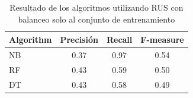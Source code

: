 \begin{table}[H]
\centering
\captionsetup{labelsep=period, labelfont=bf}
\caption{Resultado de los algoritmos utilizando RUS con balanceo solo al conjunto de entrenamiento}
\fontsize{12pt}{10pt}\selectfont
\begin{tabular}{lccc}
\toprule 
\textbf{Algorithm} & \textbf{Precisión} & \textbf{Recall} & \textbf{F-measure} \\
\midrule 
NB & 0.37 & 0.97 & 0.54 \\
RF & 0.43 & 0.59 & 0.50 \\
DT & 0.43 & 0.58 & 0.49 \\
\bottomrule
\end{tabular}
\label{tab:results_rus_sin}
\end{table}
